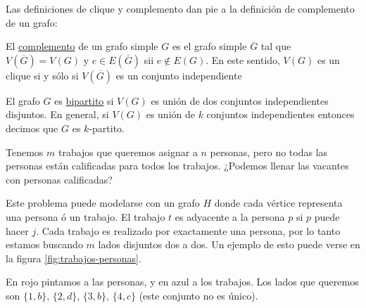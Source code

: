 Las definiciones de clique y complemento dan pie a la definición de complemento de un grafo:

\begin{defn}
    El \ul{complemento} de un grafo simple $G$ es el grafo simple $\overline{G}$ tal que $V(\overline{G}) = V(G)$ y $e \in E(\overline{G})$ sii $e \notin E(G)$. En este sentido, $V(G)$ es un clique si y sólo si $V(\overline{G})$ es un conjunto independiente
\end{defn}

\begin{defn}
    El grafo $G$ es \ul{bipartito} si $V(G)$ es unión de dos conjuntos independientes disjuntos. En general, si $V(G)$ es unión de $k$ conjuntos independientes entonces decimos que $G$ es $k$-partito.
\end{defn}

\begin{prob}
    Tenemos $m$ trabajos que queremos asignar a $n$ personas, pero no todas las personas están calificadas para todos los trabajos. ¿Podemos llenar las vacantes con personas calificadas?
    
    Este problema puede modelarse con un grafo $H$ donde cada vértice representa una persona ó un trabajo. El trabajo $t$ es adyacente a la persona $p$ si $p$ puede hacer $j$. Cada trabajo es realizado por exactamente una persona, por lo tanto estamos buscando $m$ lados disjuntos dos a dos. Un ejemplo de esto puede verse en la figura \ref{fig:trabajos-personas}.
    
    \begin{marginfigure}\label{fig:trabajos-personas}
        \centering
        \caption{En rojo pintamos a las personas, y en azul a los trabajos. Los lados que queremos son $\{1,b\}$, $\{2,d\}$, $\{3,b\}$, $\{4,c\}$ (este conjunto no es único).}
    \end{marginfigure}
\end{prob}

